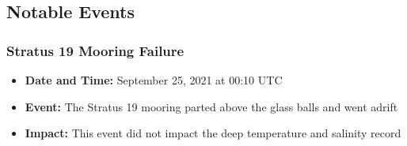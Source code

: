 \subsection{Notable Events}

\subsubsection{Stratus 19 Mooring Failure}
\begin{itemize}
  \item \textbf{Date and Time:} September 25, 2021 at 00:10 UTC
  \item \textbf{Event:} The Stratus 19 mooring parted above the glass balls and went adrift
  \item \textbf{Impact:} This event did not impact the deep temperature and salinity record
\end{itemize}

